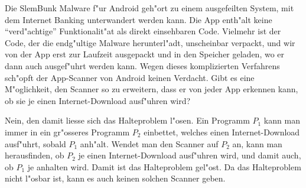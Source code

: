 Die SlemBunk Malware f"ur Android geh"ort zu einem ausgefeilten
System, mit dem Internet Banking unterwandert werden kann.
Die App enth"alt keine ``verd"achtige'' Funktionalit"at als direkt
einsehbaren Code. 
Vielmehr ist der Code, der die endg"ultige Malware herunterl"adt,
unscheinbar verpackt, und wir von der App erst zur Laufzeit
ausgepackt und in den Speicher geladen, wo er dann auch ausgef"uhrt
werden kann.
Wegen dieses komplizierten Verfahrens sch"opft der App-Scanner von
Android keinen Verdacht.
Gibt es eine M"oglichkeit, den Scanner so zu erweitern, dass er 
von jeder App erkennen kann, ob sie je einen Internet-Download
ausf"uhren wird?

\begin{loesung}
Nein, den damit liesse sich das Halteproblem l"osen.
Ein Programm $P_1$ kann man immer in ein gr"osseres Programm $P_2$
einbettet, welches einen Internet-Download ausf"uhrt, sobald $P_1$
anh"alt.
Wendet man den Scanner auf $P_2$ an,
kann man herausfinden, ob $P_2$
je einen Internet-Download ausf"uhren wird, und damit auch, ob
$P_1$ je anhalten wird.
Damit ist das Halteproblem gel"ost.
Da das Halteproblem nicht l"osbar ist, kann es auch keinen solchen
Scanner geben.
\end{loesung}





